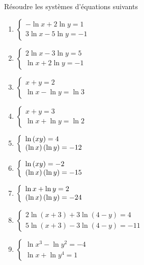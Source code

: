  
  \begin{exercice}
Résoudre les systèmes d'équations suivants
\begin{enumerate}
\item $  \left\{\begin{array}{l}-\ln x+ 2\ln y=1  \\ 3\ln x-5\ln y =-1 \end{array}\right.$
\item $  \left\{\begin{array}{l}2\ln x-3\ln y=5  \\ \ln x+2\ln y =-1 \end{array}\right.$
\item $  \left\{\begin{array}{l} x+y=2  \\ \ln x-\ln y =\ln 3\end{array}\right.$
\item $  \left\{\begin{array}{l} x+y=3  \\ \ln x+\ln y =\ln 2\end{array}\right.$
\item $  \left\{\begin{array}{l} \ln \left(xy\right)=4  \\ \left(\ln x\right)\left(\ln y\right) =-12 \end{array}\right.$
\item $  \left\{\begin{array}{l} \ln \left(xy\right)=-2  \\ \left(\ln x\right)\left(\ln y\right) =-15 \end{array}\right.$
\item $  \left\{\begin{array}{l} \ln x+\ln y=2  \\ \left(\ln x\right)\left(\ln y\right) =-24 \end{array}\right.$
\item $  \left\{\begin{array}{l}2\ln (x+3)+ 3\ln (4-y)=4  \\ 5\ln (x+3)-3\ln (4-y) =-11 \end{array}\right.$
\item $  \left\{\begin{array}{l}\ln x^{3}-\ln y^{2}=-4  \\ \ln x+\ln y^{4} =1 \end{array}\right.$
\end{enumerate}

  \end{exercice}
 
